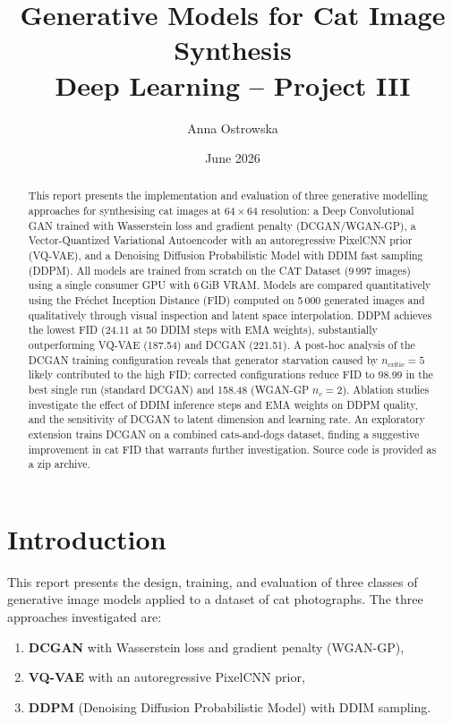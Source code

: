 \documentclass[12pt,a4paper]{article}
\title{\textbf{Generative Models for Cat Image Synthesis}\\
       \large Deep Learning -- Project III}
\author{Anna Ostrowska}
\date{June 2026}
\begin{document}
\maketitle

\begin{abstract}
This report presents the implementation and evaluation of three generative
modelling approaches for synthesising cat images at $64\times64$ resolution:
a Deep Convolutional GAN trained with Wasserstein loss and gradient penalty
(DCGAN/WGAN-GP), a Vector-Quantized Variational Autoencoder with an
autoregressive PixelCNN prior (VQ-VAE), and a Denoising Diffusion Probabilistic
Model with DDIM fast sampling (DDPM).  All models are trained from scratch on
the CAT Dataset ($9\,997$ images) using a single consumer GPU with 6\,GiB VRAM.
Models are compared quantitatively using the Fr\'{e}chet Inception Distance (FID)
computed on 5\,000 generated images and qualitatively through visual inspection
and latent space interpolation.  DDPM achieves the lowest FID (24.11 at 50 DDIM
steps with EMA weights), substantially outperforming VQ-VAE (187.54) and
DCGAN (221.51).  A post-hoc analysis of the DCGAN training configuration reveals
that generator starvation caused by $n_{\text{critic}}=5$ likely contributed to
the high FID; corrected configurations reduce FID to 98.99 in the best single
run (standard DCGAN) and 158.48 (WGAN-GP $n_c=2$).  Ablation studies investigate the effect of DDIM
inference steps and EMA weights on DDPM quality, and the sensitivity of DCGAN to
latent dimension and learning rate.  An exploratory extension trains DCGAN on a
combined cats-and-dogs dataset, finding a suggestive improvement in cat FID that
warrants further investigation.  Source code is provided as a zip archive.
\end{abstract}

\tableofcontents
\newpage

\section{Introduction}
\label{sec:intro}

This report presents the design, training, and evaluation of three classes of
generative image models applied to a dataset of cat photographs.  The three
approaches investigated are:

\begin{enumerate}[noitemsep]
  \item \textbf{DCGAN} with Wasserstein loss and gradient penalty (WGAN-GP),
  \item \textbf{VQ-VAE} with an autoregressive PixelCNN prior,
  \item \textbf{DDPM} (Denoising Diffusion Probabilistic Model) with DDIM
        sampling.
\end{enumerate}
\end{document}
